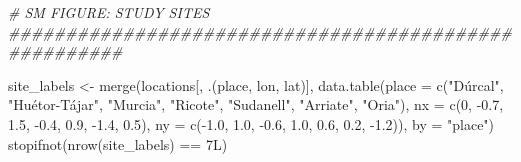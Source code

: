 \documentclass[
  11pt,
]{article}
\newenvironment{Shaded}{\begin{snugshade}}{\end{snugshade}}
\newcommand{\AttributeTok}[1]{\textcolor[rgb]{0.77,0.63,0.00}{#1}}
\newcommand{\CommentTok}[1]{\textcolor[rgb]{0.56,0.35,0.01}{\textit{#1}}}
\newcommand{\DecValTok}[1]{\textcolor[rgb]{0.00,0.00,0.81}{#1}}
\newcommand{\FloatTok}[1]{\textcolor[rgb]{0.00,0.00,0.81}{#1}}
\newcommand{\FunctionTok}[1]{\textcolor[rgb]{0.00,0.00,0.00}{#1}}
\newcommand{\NormalTok}[1]{#1}
\newcommand{\OtherTok}[1]{\textcolor[rgb]{0.56,0.35,0.01}{#1}}
\newcommand{\SpecialCharTok}[1]{\textcolor[rgb]{0.00,0.00,0.00}{#1}}
\newcommand{\StringTok}[1]{\textcolor[rgb]{0.31,0.60,0.02}{#1}}
\begin{document}
\begin{Shaded}
\begin{Highlighting}[]
\CommentTok{\# SM FIGURE: STUDY SITES \#\#\#\#\#\#\#\#\#\#\#\#\#\#\#\#\#\#\#\#\#\#\#\#\#\#\#\#\#\#\#\#\#\#\#\#\#\#\#\#\#\#\#\#\#\#\#\#\#\#\#\#\#\#}

\NormalTok{site\_labels }\OtherTok{\textless{}{-}} \FunctionTok{merge}\NormalTok{(locations[, .(place, lon, lat)],}
                     \FunctionTok{data.table}\NormalTok{(}\AttributeTok{place =} \FunctionTok{c}\NormalTok{(}\StringTok{"Dúrcal"}\NormalTok{, }\StringTok{"Huétor{-}Tájar"}\NormalTok{, }\StringTok{"Murcia"}\NormalTok{,}
                                          \StringTok{"Ricote"}\NormalTok{, }\StringTok{"Sudanell"}\NormalTok{, }\StringTok{"Arriate"}\NormalTok{, }\StringTok{"Oria"}\NormalTok{),}
                                \AttributeTok{nx =} \FunctionTok{c}\NormalTok{(}\DecValTok{0}\NormalTok{, }\SpecialCharTok{{-}}\FloatTok{0.7}\NormalTok{, }\FloatTok{1.5}\NormalTok{, }\SpecialCharTok{{-}}\FloatTok{0.4}\NormalTok{, }\FloatTok{0.9}\NormalTok{, }\SpecialCharTok{{-}}\FloatTok{1.4}\NormalTok{, }\FloatTok{0.5}\NormalTok{),}
                                \AttributeTok{ny =} \FunctionTok{c}\NormalTok{(}\SpecialCharTok{{-}}\FloatTok{1.0}\NormalTok{, }\FloatTok{1.0}\NormalTok{, }\SpecialCharTok{{-}}\FloatTok{0.6}\NormalTok{, }\FloatTok{1.0}\NormalTok{, }\FloatTok{0.6}\NormalTok{, }\FloatTok{0.2}\NormalTok{, }\SpecialCharTok{{-}}\FloatTok{1.2}\NormalTok{)),}
                     \AttributeTok{by =} \StringTok{"place"}\NormalTok{)}
\FunctionTok{stopifnot}\NormalTok{(}\FunctionTok{nrow}\NormalTok{(site\_labels) }\SpecialCharTok{==}\NormalTok{ 7L)}


\end{Highlighting}
\end{Shaded}
\end{document}
